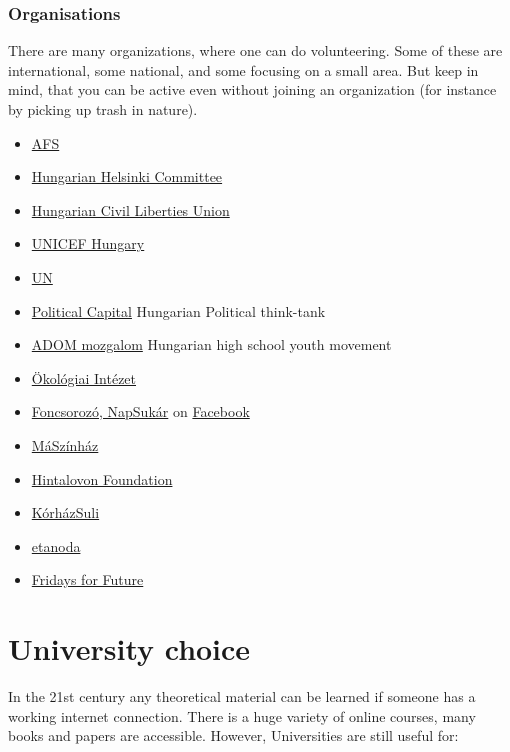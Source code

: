 \documentclass{article}
\begin{document}
\subsubsection{Organisations}
There are many organizations, where one can do volunteering. Some of these are international, some national, and some focusing on a small area.
But keep in mind, that you can be active even without joining an organization (for instance by picking up trash in nature).
\begin{itemize}
    \item \href{https://afs.org/}{AFS}
    \item \href{https://helsinki.hu/en/support/apply-to-volunteer/}{Hungarian Helsinki Committee}
    \item \href{https://hclu.hu/en/about-us}{Hungarian Civil Liberties Union}
    \item \href{https://unicef.hu/igy-segithetsz/onkentes}{UNICEF Hungary}
    \item \href{https://www.unv.org/}{UN}
    \item \href{https://www.politicalcapital.hu/}{Political Capital} Hungarian Political think-tank
    \item \href{https://adommozgalom.hu/}{ADOM mozgalom} Hungarian high school youth movement
    \item \href{https://www.ecolinst.hu/index.php}{Ökológiai Intézet}
    \item \href{https://web.archive.org/web/20171124170411/http://foncsorozo.hu/napsukar/}{Foncsorozó, NapSukár} on \href{https://www.facebook.com/napsukar/}{Facebook}
    \item \href{https://mas-zinhaz.hu/}{MáSzínház}
    \item \href{https://hintalovon.hu/en/child-participation-policy/}{Hintalovon Foundation}
    \item \href{https://korhazsuli.hu/onkenteseknek/}{KórházSuli}
    \item \href{http://www.etanoda.hu/segits_oktatassal_gyere_hozzank_mentornak_207}{etanoda}
    \item \href{https://fridaysforfuture.org/}{Fridays for Future}
\end{itemize}

\section{University choice}

In the 21st century any theoretical material can be learned if someone has a working internet connection. There is a huge variety of online courses, many books and papers are accessible. However, Universities are still useful for:
\end{document}
